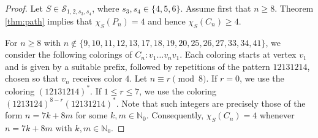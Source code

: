 \documentclass[12pt]{article}
\begin{document}
\begin{proof} 
Let $S \in \mathcal S_{1,2,s_3,s_4}$, where $s_3, s_4 \in \{4, 5, 6\}$. Assume first that $n \ge 8$. Theorem \ref{thm:path} implies that $\chi_S(P_n)=4$ and hence $\chi_S(C_n)\ge 4$. 
    
 For $n \ge 8$ with $n \notin \{9,10,11,12,13,17,18,19,20,25,26,27,33,34,41\}$, we consider the following colorings of $C_n \colon v_1 \dots v_nv_1$. Each coloring starts at vertex $v_1$ and is given by a suitable prefix, followed by repetitions of the pattern $12131214$, chosen so that $v_n$ receives color $4$.
Let $n \equiv r \pmod {8}$. 
If $r=0$, we use the coloring $(12131214)^*$. 
If $1\le r\le 7$, we use the  coloring $(1213124)^{8-r}(12131214)^* .$ Note that such integers  are precisely those of the form $n=7k+8m$ for some $k,m \in \mathbb{N}_{0}$.
Consequently, $\chi_S(C_n)=4$ whenever $n=7k+8m$ with $k,m \in \mathbb{N}_{0}$.


\end{proof}
\end{document}
